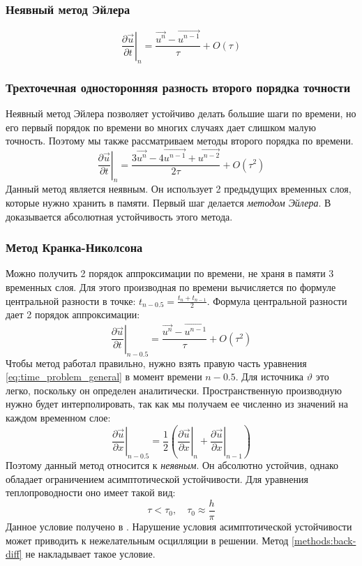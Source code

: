 \subsubsection{Неявный метод Эйлера}
\begin{equation}
\left. \frac{\partial \vec u}{\partial t} \right \vert_{n} = \frac{\vec {u^n} - \vec {u^{n-1}}}{\tau} + O(\tau)
\end{equation}
\subsubsection{Трехточечная односторонняя разность второго порядка точности \label{methods:back-diff}}
Неявный метод Эйлера позволяет устойчиво делать большие шаги по времени, но его первый порядок по времени во многих случаях дает слишком малую точность. Поэтому мы также рассматриваем методы второго порядка по времени.
\begin{equation} 
\left. \frac{\partial \vec u}{\partial t} \right \vert_{n} = \frac{3 \vec {u^{n}} - 4 \vec {u^{n - 1}} + \vec {u^{n - 2}}} {2 \tau} + O(\tau^2)
\end{equation}
Данный метод является неявным. Он использует 2 предыдущих временных слоя, которые нужно хранить в памяти. Первый шаг делается \textit{методом Эйлера}. В \cite{Samarski-intro} доказывается абсолютная устойчивость этого метода.
\subsubsection{Метод Кранка-Николсона}
Можно получить 2 порядок аппроксимации по времени, не храня в памяти 3 временных слоя. Для этого производная по времени вычисляется по формуле центральной разности в точке: $t_{n-0.5} = \frac{t_{n} + t_{n-1}}{2}$. Формула центральной разности дает 2 порядок аппроксимации: 
\begin{equation}
\left. \frac{\partial \vec {u}}{\partial t} \right \vert_{n-0.5} = \frac{\vec {u^n} - \vec {u^{n-1}}}{\tau} + O(\tau ^ 2)
\end{equation}
Чтобы метод работал правильно, нужно взять правую часть уравнения \eqref{eq:time_problem_general} в момент времени $n-0.5$. 
Для источника $\vartheta$ это легко, поскольку он определен аналитически. Пространственную производную нужно будет интерполировать, так как мы получаем ее численно из значений на каждом временном слое:
\begin{equation}
\left. \frac{\partial \vec u}{\partial x} \right \vert_{n-0.5} = \frac{1}{2}\left( \left. \frac{\partial \vec u}{\partial x} \right \vert_{n} + \left. \frac{\partial \vec u}{\partial x} \right \vert_{n - 1} \right)
\end{equation}
Поэтому данный метод относится к \textit{неявным}. Он абсолютно устойчив, однако обладает ограничением асимптотической устойчивости. Для уравнения теплопроводности оно имеет такой вид:
\begin{equation}
\tau < \tau_0,
\quad
\tau_0 \approx \frac {h}{\pi}
\end{equation}
Данное условие получено в \cite{Samarski-intro}. Нарушение условия асимптотической устойчивости может приводить к нежелательным осцилляции в решении. Метод \ref{methods:back-diff} не накладывает такое условие.

